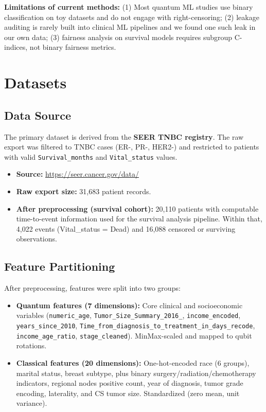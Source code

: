 \documentclass[12pt, letterpaper]{article}
\begin{document}
\noindent\textbf{Limitations of current methods:} (1) Most quantum ML studies use binary classification on toy datasets and do not engage with right-censoring; (2) leakage auditing is rarely built into clinical ML pipelines and we found one such leak in our own data; (3) fairness analysis on survival models requires subgroup C-indices, not binary fairness metrics.


\section{Datasets}

\subsection{Data Source}
The primary dataset is derived from the \textbf{SEER TNBC registry}. The raw export was filtered to TNBC cases (ER-, PR-, HER2-) and restricted to patients with valid \texttt{Survival\_months} and \texttt{Vital\_status} values.

\begin{itemize}
    \item \textbf{Source:} \url{https://seer.cancer.gov/data/}
    \item \textbf{Raw export size:} 31{,}683 patient records.
    \item \textbf{After preprocessing (survival cohort):} 20{,}110 patients with computable time-to-event information used for the survival analysis pipeline. Within that, 4{,}022 events (Vital\_status = Dead) and 16{,}088 censored or surviving observations.
\end{itemize}

\subsection{Feature Partitioning}
After preprocessing, features were split into two groups:
\begin{itemize}
    \item \textbf{Quantum features (7 dimensions):} Core clinical and socioeconomic variables (\texttt{numeric\_age}, \texttt{Tumor\_Size\_Summary\_2016\_}, \texttt{income\_encoded}, \texttt{years\_since\_2010}, \texttt{Time\_from\_diagnosis\_to\_treatment\_in\_days\_recode}, \texttt{income\_age\_ratio}, \texttt{stage\_cleaned}). MinMax-scaled and mapped to qubit rotations.
    \item \textbf{Classical features (20 dimensions):} One-hot-encoded race (6 groups), marital status, breast subtype, plus binary surgery/radiation/chemotherapy indicators, regional nodes positive count, year of diagnosis, tumor grade encoding, laterality, and CS tumor size. Standardized (zero mean, unit variance).
\end{itemize}
\end{document}
